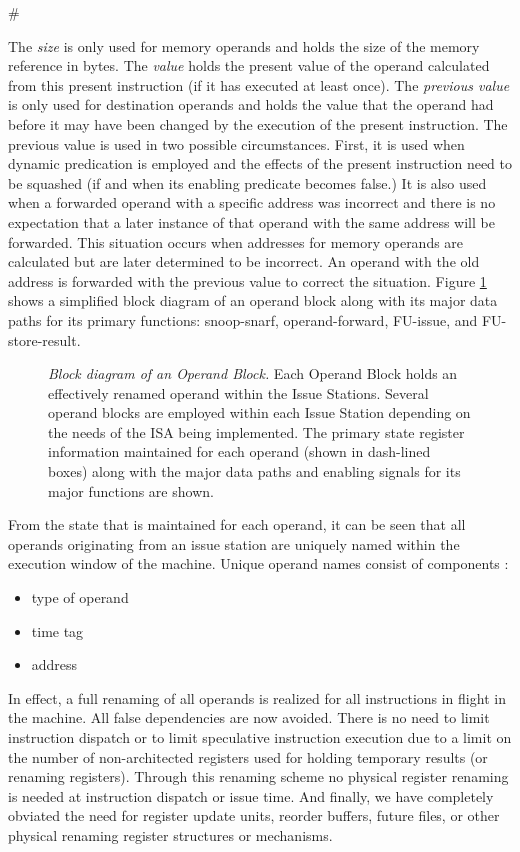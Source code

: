 #\documentclass[10pt,dvips]{article}
\begin{document}
The \textit{size} is only used for memory operands and holds
the size of the memory reference in bytes.
The \textit{value} holds the present value of the operand
calculated from this present instruction (if it has executed
at least once).
The \textit{previous value} is only used for destination
operands and holds the value that the operand
had before it may have been changed by the execution of 
the present instruction.
The previous value is used in two possible circumstances.
First, it is used when dynamic predication is
employed and the effects of the present instruction need to be
squashed (if and when its enabling predicate becomes false.)
It is also used when a forwarded operand with a specific
address was incorrect 
and there is no expectation that a later instance
of that operand with the same address will be forwarded.
This situation occurs when addresses for memory operands are
calculated but are later determined to be incorrect.
An operand with the old address is forwarded with the previous
value to correct the situation.
Figure \ref{fig:operand} shows a simplified block diagram of
an operand block along with its major data paths for its
primary functions: snoop-snarf, operand-forward, FU-issue,
and FU-store-result.
%
\begin{figure}
\centering
\scriptsize {
}
\caption{{\em Block diagram of an Operand Block.} 
Each Operand Block holds an effectively renamed 
operand within the Issue Stations.
Several operand blocks are employed within each Issue Station
depending on the needs of the ISA being implemented.
The primary state register information maintained for each operand (shown in
dash-lined boxes)
along with the major data paths and enabling signals for
its major functions are shown.}
\label{fig:operand}
\end{figure}
%

From the state that is maintained for each operand, it can be seen
that all operands originating from an issue station
are uniquely named within the
execution window of the machine.
Unique operand names consist of components :
%
\begin{itemize}
\vspace{-0.10in}
\item{type of operand}
\vspace{-0.10in}
\item{time tag}
\vspace{-0.10in}
\item{address}
\vspace{-0.10in}
\end{itemize}   
%
In effect, a full renaming of
all operands is realized for all instructions
in flight in the machine.  
All false dependencies are now avoided.
There is no need to limit instruction dispatch or to limit speculative
instruction execution due to a limit on the number of non-architected
registers used for holding temporary results (or renaming registers).
Through this renaming scheme
no physical register renaming is needed at instruction dispatch
or issue time.  
And finally, we have completely obviated the need for
register update units, reorder buffers, future files, or other physical 
renaming register structures or mechanisms.
%
%
\end{document}
